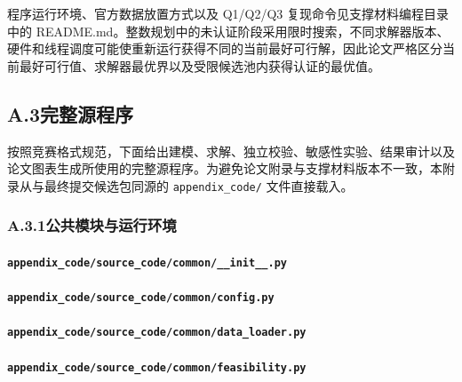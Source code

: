程序运行环境、官方数据放置方式以及 Q1/Q2/Q3 复现命令见支撑材料编程目录中的 README.md。整数规划中的未认证阶段采用限时搜索，不同求解器版本、硬件和线程调度可能使重新运行获得不同的当前最好可行解，因此论文严格区分当前最好可行值、求解器最优界以及受限候选池内获得认证的最优值。

\subsection*{A.3\quad 完整源程序}

按照竞赛格式规范，下面给出建模、求解、独立校验、敏感性实验、结果审计以及论文图表生成所使用的完整源程序。为避免论文附录与支撑材料版本不一致，本附录从与最终提交候选包同源的 \texttt{appendix\_code/} 文件直接载入。

\subsubsection*{A.3.1\quad 公共模块与运行环境}

\paragraph{\nolinkurl{appendix_code/source_code/common/__init__.py}}


\paragraph{\nolinkurl{appendix_code/source_code/common/config.py}}


\paragraph{\nolinkurl{appendix_code/source_code/common/data_loader.py}}


\paragraph{\nolinkurl{appendix_code/source_code/common/feasibility.py}}

